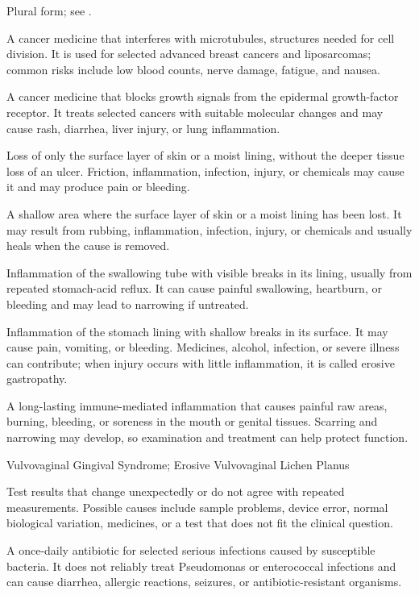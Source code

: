 Plural form; see .

 A cancer medicine that interferes with microtubules, structures needed for cell division. It is used for selected advanced breast cancers and liposarcomas; common risks include low blood counts, nerve damage, fatigue, and nausea.

 A cancer medicine that blocks growth signals from the epidermal growth-factor receptor. It treats selected cancers with suitable molecular changes and may cause rash, diarrhea, liver injury, or lung inflammation.

 Loss of only the surface layer of skin or a moist lining, without the deeper tissue loss of an ulcer. Friction, inflammation, infection, injury, or chemicals may cause it and may produce pain or bleeding.

 A shallow area where the surface layer of skin or a moist lining has been lost. It may result from rubbing, inflammation, infection, injury, or chemicals and usually heals when the cause is removed.

 Inflammation of the swallowing tube with visible breaks in its lining, usually from repeated stomach-acid reflux. It can cause painful swallowing, heartburn, or bleeding and may lead to narrowing if untreated.

 Inflammation of the stomach lining with shallow breaks in its surface. It may cause pain, vomiting, or bleeding. Medicines, alcohol, infection, or severe illness can contribute; when injury occurs with little inflammation, it is called erosive gastropathy.

 A long-lasting immune-mediated inflammation that causes painful raw areas, burning, bleeding, or soreness in the mouth or genital tissues. Scarring and narrowing may develop, so examination and treatment can help protect function.

\synonyms
Vulvovaginal Gingival Syndrome; Erosive Vulvovaginal Lichen Planus

 Test results that change unexpectedly or do not agree with repeated measurements. Possible causes include sample problems, device error, normal biological variation, medicines, or a test that does not fit the clinical question.

 A once-daily antibiotic for selected serious infections caused by susceptible bacteria. It does not reliably treat Pseudomonas or enterococcal infections and can cause diarrhea, allergic reactions, seizures, or antibiotic-resistant organisms.

